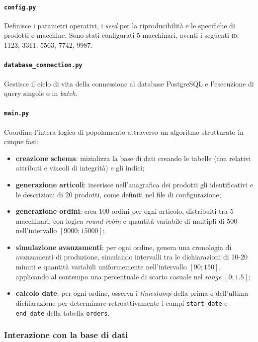 \documentclass[12pt]{article}
\begin{document}
    \paragraph{\texttt{config.py}} Definisce i parametri operativi, i \textit{seed} per la riproducibilità e le specifiche di prodotti e macchine. Sono stati configurati 5 macchinari, aventi i seguenti \textsc{id}: 1123, 3311, 5563, 7742, 9987.

    \paragraph{\texttt{database\_connection.py}} Gestisce il ciclo di vita della connessione al database PostgreSQL e l'esecuzione di query singole o in \textit{batch}.

    \paragraph{\texttt{main.py}} Coordina l'intera logica di popolamento attraverso un algoritmo strutturato in cinque fasi:
    \begin{itemize}
        \item \textbf{creazione schema}: inizializza la base di dati creando le tabelle (con relativi attributi e vincoli di integrità) e gli indici;
        \item \textbf{generazione articoli}: inserisce nell'anagrafica dei prodotti gli identificativi e le descrizioni di 20 prodotti, come definiti nel file di configurazione;
        \item \textbf{generazione ordini}: crea 100 ordini per ogni articolo, distribuiti tra 5 macchinari, con logica \textit{round-robin} e quantità variabile di multipli di 500 nell'intervallo $[9000;15000]$;
        \item \textbf{simulazione avanzamenti}: per ogni ordine, genera una cronologia di avanzamenti di produzione, simulando intervalli tra le dichiarazioni di 10-20 minuti e quantità variabili uniformemente nell'intervallo $[90;150]$, applicando al contempo una percentuale di scarto casuale nel \textit{range} $[0;1.5]$;
        \item \textbf{calcolo date}: per ogni ordine, osserva i \textit{timestamp} della prima e dell'ultima dichiarazione per determinare retroattivamente i campi \verb|start_date| e \verb|end_date| della tabella \verb|orders|.
    \end{itemize}
    
    \subsubsection{Interazione con la base di dati}
\end{document}
